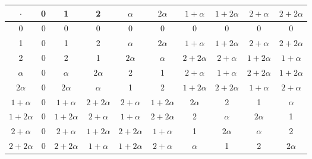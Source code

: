 \documentclass{article}
\begin{document}
\begin{center}
    \begin{tabular}{c||c|c|c|c|c|c|c|c|c}
        $\cdot$ & 0 & 1 & 2 & $\alpha$ & $2\alpha$ & $1 + \alpha$ & $1 + 2\alpha$ & $2 + \alpha$ & $2 + 2\alpha$ \\
        \hline\hline
        0 & 0 & 0 & 0 & 0 & 0 & 0 & 0 & 0 & 0 \\
        \hline
        1 & 0 & 1 & 2 & $\alpha$ & $2\alpha$ & $1 + \alpha$ & $1 + 2\alpha$ & $2 + \alpha$ & $2 + 2\alpha$ \\
        \hline
        2 & 0 & 2 & 1 & $2\alpha$ & $\alpha$ & $2 + 2\alpha$ & $2 + \alpha$ & $1 + 2\alpha$ & $ 1 + \alpha$ \\
        \hline
        $\alpha$ & 0 & $\alpha$ & $2\alpha$ & 2 & 1 & $2 + \alpha$ & $1 + \alpha$ & $2 + 2\alpha$ & $1 + 2\alpha$ \\
        \hline
        $2\alpha$ & 0 & $2\alpha$ & $\alpha$ & 1 & 2 & $1 + 2\alpha$ & $2 + 2\alpha$ & $1 + \alpha$ & $2 + \alpha$ \\
        \hline
        $1 + \alpha$ & 0 & $1 + \alpha$ & $2 + 2\alpha$ & $2 + \alpha$ & $1 + 2\alpha$ & $2\alpha$ & 2 & 1 & $\alpha$ \\
        \hline
        $1 + 2\alpha$ & 0 & $1 + 2\alpha$ & $2 + \alpha$ & $1 + \alpha$ & $2 + 2\alpha$ & 2 & $\alpha$ & $2\alpha$ & 1 \\
        \hline
        $2 + \alpha$ & 0 & $2 + \alpha$ & $1 + 2\alpha$ & $2 + 2\alpha$ & $1 + \alpha$ & 1 & $2\alpha$ & $\alpha$ & 2 \\
        \hline
        $2 + 2\alpha$ & 0 & $2 + 2\alpha$ & $1 + \alpha$ & $1 + 2\alpha$ & $2 + \alpha$ & $\alpha$ & 1 & 2 & $2\alpha$ \\
        
        
        
    \end{tabular}
\end{center}
\end{document}
